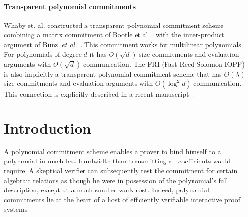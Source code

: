 \paragraph{Transparent polynomial commitments} 
Whaby et. al. constructed a transparent polynomial commitment scheme combining a matrix commitment of Bootle et al.~\cite{EC:BCCGP16} with the inner-product argument of B\"{u}nz~\emph{et al.}~\cite{SP:BBBPWM18}. This commitment works for multilinear polynomials. For polynomials of degree $d$ it has $O(\sqrt{d})$ size commitments and evaluation arguments with $O(\sqrt{d})$ communication. 
The  FRI (Fast Reed Solomon IOPP)~\cite{ICALP:BBHR18} is also implicitly a transparent polynomial commitment scheme that has $O(\lambda)$ size commitments and evaluation arguments with $O(\log^2 d)$ communication. This connection is explicitly described in a recent manuscript~\cite{MatterLabs}. 


\section{Introduction}

A polynomial commitment scheme enables a prover to bind himself to a polynomial in much less bandwidth than transmitting all coefficients would require. A skeptical verifier can subsequently test the commitment for certain algebraic relations as though he were in possession of the polynomial's full description, except at a much smaller work cost. Indeed, polynomial commitments lie at the heart of a host of efficiently verifiable interactive proof systems.


